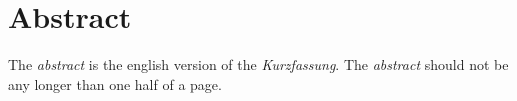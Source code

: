 

\chapter*{Abstract}



The \emph{abstract} is the english version of the \emph{Kurzfassung}. The  \emph{abstract} should not be any longer than one half of a page.